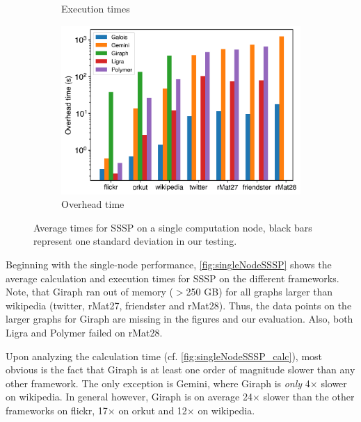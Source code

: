 \begin{figure}
\begin{subfigure}{0.32\textwidth}
		\caption{Execution times}
		\label{fig:singleNodeSSSP_exec}
	\end{subfigure}
	\hfil
	\begin{subfigure}{0.32\textwidth}
		\includegraphics[width=\linewidth]{../../plots/singleNodeSSSP_overheadTime.png}
		\caption{Overhead time}
		\label{fig:singleNodeSSSP_overhead}
	\end{subfigure}
	\caption{Average times for SSSP on a single computation node, black bars represent one standard deviation in our testing.}
	\label{fig:singleNodeSSSP}
\end{figure}
Beginning with the single-node performance, \autoref{fig:singleNodeSSSP} shows the average calculation and execution times for SSSP on the different frameworks.
Note, that Giraph ran out of memory ($>$250 GB) for all graphs larger than wikipedia (twitter, rMat27, friendster and rMat28). Thus, the data points on the larger graphs for Giraph are missing in the figures and our evaluation. 
Also, both Ligra and Polymer failed on rMat28.

Upon analyzing the calculation time (cf. \autoref{fig:singleNodeSSSP_calc}), most obvious is the fact that Giraph is at least one order of magnitude slower than any other framework. The only exception is Gemini, where Giraph is \emph{only} 4$\times$ slower on wikipedia. In general however, Giraph is on average 24$\times$ slower than the other frameworks on flickr, 17$\times$ on orkut and 12$\times$ on wikipedia.

